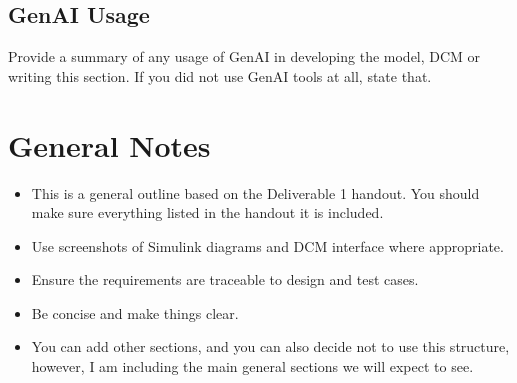 \documentclass{article}
\begin{document}
\subsection{GenAI Usage}
Provide a summary of any usage of GenAI in developing the model, DCM or writing this section. If you did not use GenAI tools at all, state that.

\section{General Notes}
\begin{itemize}
    \item This is a general outline based on the Deliverable 1 handout. You should make sure everything listed in the handout it is included. 
    \item Use screenshots of Simulink diagrams and DCM interface where appropriate.
    \item Ensure the requirements are traceable to design and test cases.
    \item Be concise and make things clear.
    \item You can add other sections, and you can also decide not to use this structure, however, I am including the main general sections we will expect to see.
\end{itemize}
\end{document}

